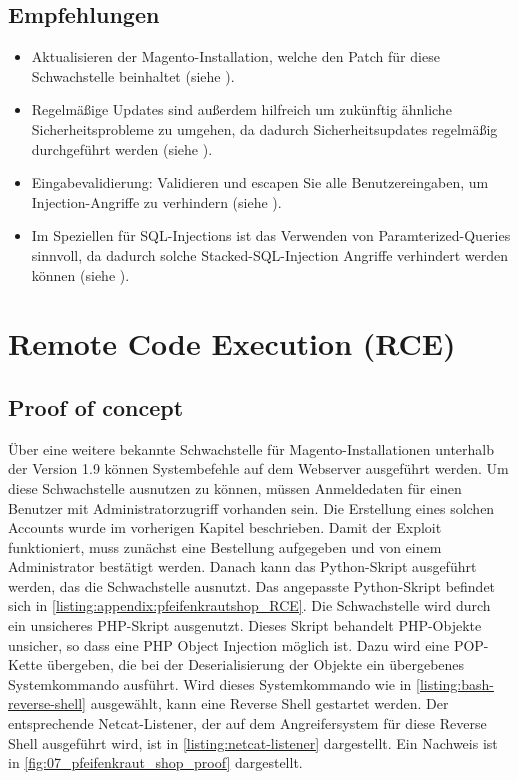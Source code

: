 \subsection*{Empfehlungen}
\begin{itemize}
    \item Aktualisieren der Magento-Installation, welche den Patch für diese Schwachstelle beinhaltet (siehe \cite{owaspVulnerableDependency}).
    \item Regelmäßige Updates sind außerdem hilfreich um zukünftig ähnliche Sicherheitsprobleme zu umgehen, da dadurch Sicherheitsupdates regelmäßig durchgeführt werden (siehe \cite{owaspVulnerableDependency}).
    \item Eingabevalidierung: Validieren und escapen Sie alle Benutzereingaben, um Injection-Angriffe zu verhindern (siehe \cite{owaspInputValidation}).
    \item Im Speziellen für SQL-Injections ist das Verwenden von Paramterized-Queries sinnvoll, da dadurch solche Stacked-SQL-Injection Angriffe verhindert werden können  (siehe \cite{owaspSQLInjectionPrevention}).
\end{itemize}


\section{\makecvssbadge Remote Code Execution (RCE)}

\subsection*{Proof of concept}
Über eine weitere bekannte Schwachstelle für Magento-Installationen unterhalb der Version 1.9 können Systembefehle auf dem Webserver ausgeführt werden. Um diese Schwachstelle ausnutzen zu können, müssen Anmeldedaten für einen Benutzer mit Administratorzugriff vorhanden sein. Die Erstellung eines solchen Accounts wurde im vorherigen Kapitel beschrieben. Damit der Exploit funktioniert, muss zunächst eine Bestellung aufgegeben und von einem Administrator bestätigt werden. Danach kann das Python-Skript ausgeführt werden, das die Schwachstelle ausnutzt. Das angepasste Python-Skript befindet sich in \autoref{listing:appendix:pfeifenkrautshop_RCE}.  Die Schwachstelle wird durch ein unsicheres PHP-Skript ausgenutzt. Dieses Skript behandelt PHP-Objekte unsicher, so dass eine PHP Object Injection möglich ist. Dazu wird eine POP-Kette übergeben, die bei der Deserialisierung der Objekte ein übergebenes Systemkommando ausführt. Wird dieses Systemkommando wie in \autoref{listing:bash-reverse-shell} ausgewählt, kann eine Reverse Shell gestartet werden. Der entsprechende Netcat-Listener, der auf dem Angreifersystem für diese Reverse Shell ausgeführt wird, ist in \autoref{listing:netcat-listener} dargestellt. Ein Nachweis ist in \autoref{fig:07_pfeifenkraut_shop_proof} dargestellt. 

